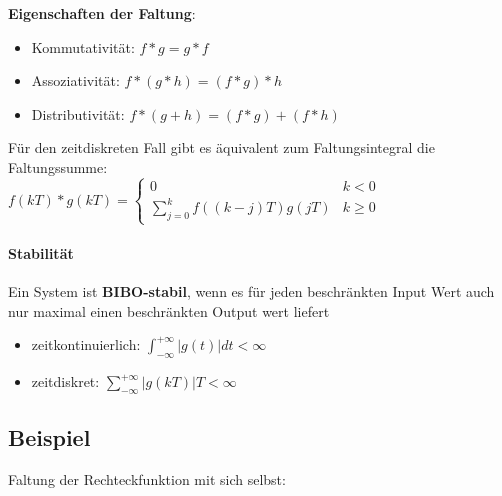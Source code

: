 \documentclass[12pt,a4paper]{article}
\newcommand{\nl}{\\[0.1cm]}
\begin{document}
\textbf{Eigenschaften der Faltung}:
\begin{itemize}
\item Kommutativität: $f \ast g = g \ast f$
\item Assoziativität: $f \ast (g \ast h) = (f \ast g) \ast h$
\item Distributivität: $f \ast (g+h) = (f \ast g) + (f \ast h)$
\end{itemize}
\flushleft
Für den zeitdiskreten Fall gibt es äquivalent zum Faltungsintegral die Faltungssumme:\nl
$\displaystyle f(kT) \ast g(kT) = \begin{cases} 0 & k<0 \\
\displaystyle \sum_{j=0}^k f((k-j)T)g(jT) & k \geq 0
\end{cases}$

\paragraph{Stabilität}
Ein System ist \textbf{BIBO-stabil}, wenn es für jeden beschränkten Input Wert auch nur maximal einen beschränkten 
Output wert liefert\nl
\begin{itemize}
\item zeitkontinuierlich: $\displaystyle \int_{-\infty}^{+\infty} |g(t)|dt < \infty$
\item zeitdiskret: $\displaystyle \sum_{-\infty}^{+\infty} |g(kT)|T < \infty$
\end{itemize}

\subsection{Beispiel}
Faltung der Rechteckfunktion mit sich selbst:\nl
\end{document}
